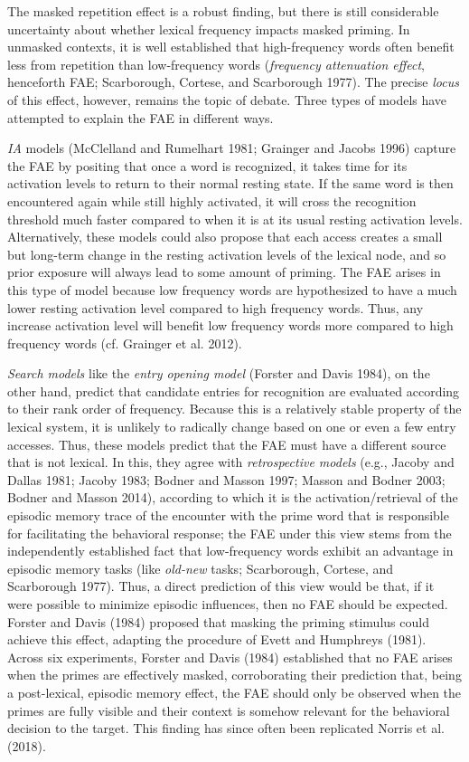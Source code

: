 \documentclass[
]{interact}
\begin{document}
The masked repetition effect is a robust finding, but there is still
considerable uncertainty about whether lexical frequency impacts masked
priming. In unmasked contexts, it is well established that
high-frequency words often benefit less from repetition than
low-frequency words (\emph{frequency attenuation effect}, henceforth
FAE; Scarborough, Cortese, and Scarborough 1977). The precise
\emph{locus} of this effect, however, remains the topic of debate. Three
types of models have attempted to explain the FAE in different ways.

\emph{IA} models (McClelland and Rumelhart 1981; Grainger and Jacobs
1996) capture the FAE by positing that once a word is recognized, it
takes time for its activation levels to return to their normal resting
state. If the same word is then encountered again while still highly
activated, it will cross the recognition threshold much faster compared
to when it is at its usual resting activation levels. Alternatively,
these models could also propose that each access creates a small but
long-term change in the resting activation levels of the lexical node,
and so prior exposure will always lead to some amount of priming. The
FAE arises in this type of model because low frequency words are
hypothesized to have a much lower resting activation level compared to
high frequency words. Thus, any increase activation level will benefit
low frequency words more compared to high frequency words (cf. Grainger
et al. 2012).

\emph{Search models} like the \emph{entry opening model} (Forster and
Davis 1984), on the other hand, predict that candidate entries for
recognition are evaluated according to their rank order of frequency.
Because this is a relatively stable property of the lexical system, it
is unlikely to radically change based on one or even a few entry
accesses. Thus, these models predict that the FAE must have a different
source that is not lexical. In this, they agree with \emph{retrospective
models} (e.g., Jacoby and Dallas 1981; Jacoby 1983; Bodner and Masson
1997; Masson and Bodner 2003; Bodner and Masson 2014), according to
which it is the activation/retrieval of the episodic memory trace of the
encounter with the prime word that is responsible for facilitating the
behavioral response; the FAE under this view stems from the
independently established fact that low-frequency words exhibit an
advantage in episodic memory tasks (like \emph{old-new} tasks;
Scarborough, Cortese, and Scarborough 1977). Thus, a direct prediction
of this view would be that, if it were possible to minimize episodic
influences, then no FAE should be expected. Forster and Davis (1984)
proposed that masking the priming stimulus could achieve this effect,
adapting the procedure of Evett and Humphreys (1981). Across six
experiments, Forster and Davis (1984) established that no FAE arises
when the primes are effectively masked, corroborating their prediction
that, being a post-lexical, episodic memory effect, the FAE should only
be observed when the primes are fully visible and their context is
somehow relevant for the behavioral decision to the target. This finding
has since often been replicated Norris et al. (2018).
\end{document}
